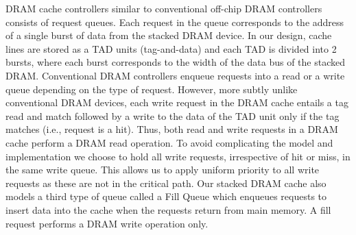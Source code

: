 \par DRAM cache controllers similar to conventional off-chip DRAM controllers consists of request queues. Each request in the queue corresponds to the address of a single burst of data from the stacked DRAM device.
In our design, cache lines are stored as a TAD units (tag-and-data) \cite{alloy} and each TAD is divided into 2 bursts, where each burst corresponds to the width of the data bus of the stacked DRAM.
Conventional DRAM controllers enqueue requests into a read or a write queue depending on the type of request. 
However, more subtly unlike conventional DRAM devices, each write request in the DRAM cache entails a tag read and match followed by a write to the data of the TAD unit only if the tag matches (i.e., request is a hit). Thus, both read and write requests in a DRAM cache perform a DRAM read operation. To avoid complicating the model and implementation we choose to hold all write requests, irrespective of hit or miss, in the same write queue. This allows us to apply uniform priority to all write requests as these are not in the critical path.
Our stacked DRAM cache also models a third type of queue called a Fill Queue \cite{dca} which enqueues requests to insert data into the cache when the requests return from main memory. A fill request performs a DRAM write operation only. 

